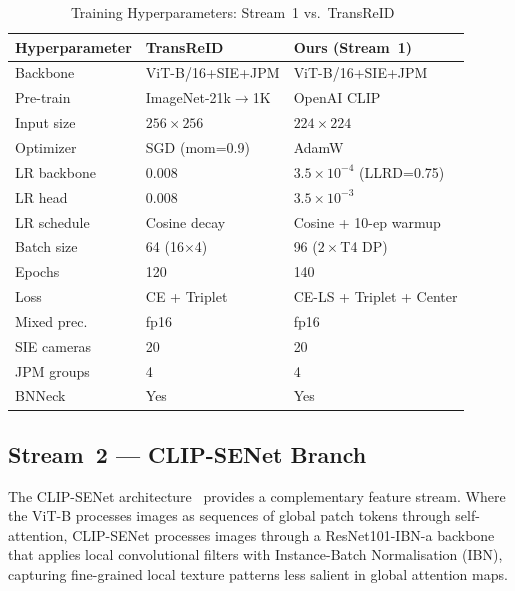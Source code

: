 \documentclass[11pt]{article}
\begin{document}
\begin{table}[!t]
  \centering
  \caption{Training Hyperparameters: Stream~1 vs.\ TransReID~\cite{he2021transreid}}
  \label{tab:hyperparams}
  \begin{tabular}{L{2.2cm}L{2.3cm}L{2.5cm}}
    \toprule
    Hyperparameter & TransReID & Ours (Stream~1) \\
    \midrule
    Backbone        & ViT-B/16+SIE+JPM  & ViT-B/16+SIE+JPM \\
    Pre-train       & ImageNet-21k$\!\to\!$1K & OpenAI CLIP~\cite{radford2021clip} \\
    Input size      & $256\times256$    & $224\times224$ \\
    Optimizer       & SGD (mom=0.9)     & AdamW~\cite{loshchilov2019adamw} \\
    LR backbone     & 0.008             & $3.5\times10^{-4}$ (LLRD=0.75) \\
    LR head         & 0.008             & $3.5\times10^{-3}$ \\
    LR schedule     & Cosine decay      & Cosine + 10-ep warmup \\
    Batch size      & 64 (16$\times$4)  & 96 ($2\times$T4 DP) \\
    Epochs          & 120               & 140 \\
    Loss            & CE + Triplet      & CE-LS + Triplet + Center \\
    Mixed prec.     & fp16              & fp16 \\
    SIE cameras     & 20                & 20 \\
    JPM groups      & 4                 & 4 \\
    BNNeck          & Yes               & Yes \\
    \bottomrule
  \end{tabular}
\end{table}

\subsection{Stream~2 --- CLIP-SENet Branch}
The CLIP-SENet architecture~\cite{lu2025clipsenet} provides a complementary
feature stream. Where the ViT-B processes images as sequences of global patch
tokens through self-attention, CLIP-SENet processes images through a
ResNet101-IBN-a backbone~\cite{pan2018ibn} that applies local convolutional
filters with Instance-Batch Normalisation (IBN), capturing fine-grained local
texture patterns less salient in global attention maps.
\end{document}
